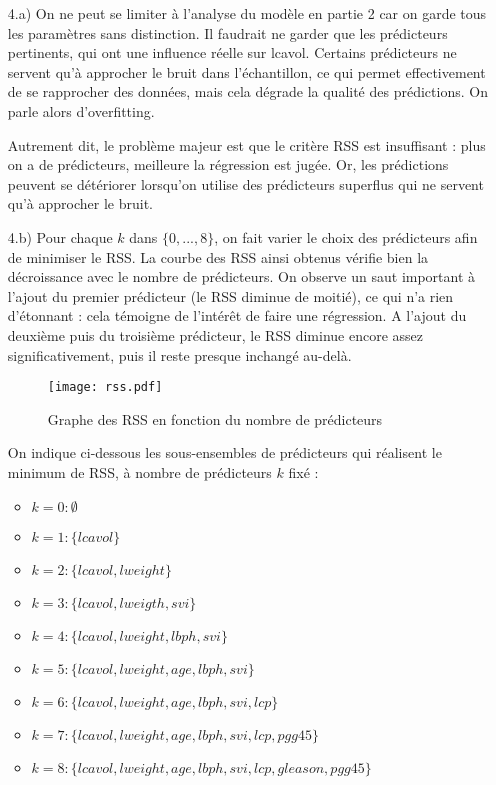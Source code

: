\documentclass[a4paper, 12pt]{article}
\begin{document}
\begin{enumerate}
\setlength{\itemsep}{12pt}

\item[4.a)] On ne peut se limiter à l'analyse du modèle en partie 2 car on garde tous les paramètres sans distinction. Il faudrait ne garder que les prédicteurs pertinents, qui ont une influence réelle sur lcavol. Certains prédicteurs ne servent qu'à approcher le bruit dans l'échantillon, ce qui permet effectivement de se rapprocher des données, mais cela dégrade la qualité des prédictions. On parle alors d'overfitting.

Autrement dit, le problème majeur est que le critère RSS est insuffisant : plus on a de prédicteurs, meilleure la régression est jugée. Or, les prédictions peuvent se détériorer lorsqu'on utilise des prédicteurs superflus qui ne servent qu'à approcher le bruit.

\item[4.b)] Pour chaque $k$ dans $\{0, ..., 8\}$, on fait varier le choix des prédicteurs afin de minimiser le RSS. La courbe des RSS ainsi obtenus vérifie bien la décroissance avec le nombre de prédicteurs. On observe un saut important à l'ajout du premier prédicteur (le RSS diminue de moitié), ce qui n'a rien d'étonnant : cela témoigne de l'intérêt de faire une régression. A l'ajout du deuxième puis du troisième prédicteur, le RSS diminue encore assez significativement, puis il reste presque inchangé au-delà.

\begin{figure}
\begin{center}
\texttt{[image: rss.pdf]}
\caption{Graphe des RSS en fonction du nombre de prédicteurs}
\end{center}
\end{figure}

On indique ci-dessous les sous-ensembles de prédicteurs qui réalisent le minimum de RSS, à nombre de prédicteurs $k$ fixé :
\begin{itemize}
\item $k = 0: \emptyset$
\item $k = 1: \{lcavol\}$
\item $k = 2: \{lcavol, lweight\}$
\item $k = 3: \{lcavol, lweigth, svi\}$
\item $k = 4: \{lcavol, lweight, lbph, svi\}$
\item $k = 5: \{lcavol, lweight, age, lbph, svi\}$
\item $k = 6: \{lcavol, lweight, age, lbph, svi, lcp\}$
\item $k = 7: \{lcavol, lweight, age, lbph, svi, lcp, pgg45\}$
\item $k = 8: \{lcavol, lweight, age, lbph, svi, lcp, gleason, pgg45\}$
\end{itemize}


\end{enumerate}
\end{document}
